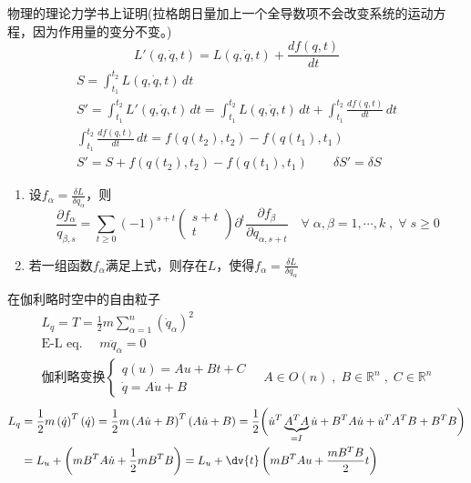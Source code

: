 \documentclass[12pt, a4paper, oneside, UTF8]{ctexbook}  %
\newcommand{\pa}{\partial}
\begin{document}
\begin{zhu}
    物理的理论力学书上证明(拉格朗日量加上一个全导数项不会改变系统的运动方程，因为作用量的变分不变。)
    \[L'(q, \dot{q}, t) = L(q, \dot{q}, t) + \frac{df(q, t)}{dt}\]
    \begin{gather*}
        S = \int_{t_1}^{t_2} L(q, \dot{q}, t) \, dt \\
        S' = \int_{t_1}^{t_2} L'(q, \dot{q}, t) \, dt 
        = \int_{t_1}^{t_2} L(q, \dot{q}, t) \, dt + \int_{t_1}^{t_2} \frac{df(q, t)}{dt} \, dt \\
        \int_{t_1}^{t_2} \frac{df(q, t)}{dt} \, dt = f(q(t_2), t_2) - f(q(t_1), t_1) \\
        S' = S + f(q(t_2), t_2) - f(q(t_1), t_1) \qquad
        \delta S' = \delta S
    \end{gather*}
\end{zhu}
\begin{thm}
    \mbox{}
    \begin{enumerate}
        \item 设\(\displaystyle f_\alpha=\frac{\delta L}{\delta q_\alpha}\)，则
        \[\frac{\pa f_\alpha}{q_{\beta,s}}=\sum_{t\geq 0}
        (-1)^{s+t}\begin{pmatrix}
            s+t\\
            t
        \end{pmatrix}\pa^t\frac{\pa f_\beta}{\pa q_{\alpha,s+t}}
        \quad\forall\;\alpha,\beta=1,\cdots,k \;,\;\forall\;s\geq 0
        \]
        \item 若一组函数\(f_\alpha\)满足上式，则存在\(L\)，使得\(f_\alpha=\frac{\delta L}{\delta q_\alpha}\)
    \end{enumerate}
\end{thm}
\begin{example}
    在伽利略时空中的自由粒子
    \begin{gather*}
        L_q=T=\frac{1}{2}m\sum_{\alpha=1}^{n}(\dot{q}_\alpha)^2\\
        \text{E-L eq. }\quad m \ddot{q}_\alpha=0\\
        \text{伽利略变换}
        \begin{cases}
            q(u)=Au+Bt+C\\
            \dot{q}=A\dot{u}+B
        \end{cases}
        \quad A\in O(n)\;,\;B\in \mathbb{R}^n\;,\; C\in \mathbb{R}^n
    \end{gather*}
    \begin{align*}
        L_q&=\frac{1}{2}m\left(\dot{q}\right)^T\left(\dot{q}\right)
        =\frac{1}{2}m\left(A\dot{u}+B\right)^T\left(A\dot{u}+B\right)
        =\frac{1}{2}\bigg(\dot{u}^T \underbrace{A^T A}_{=I}\dot{u}
        +B^T A\dot{u}+\dot{u}^T A^T B +B^T B\bigg)\\
        &=L_u +\left(mB^T A \dot{u}+\frac{1}{2}m B^T B\right)
        =L_u +\dv{t}\left(m B^T A u+ \frac{mB^TB}{2}t\right)
    \end{align*}
\end{example}
\end{document}
